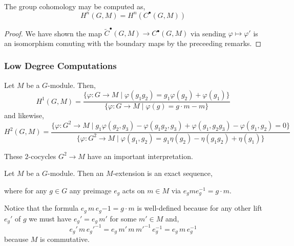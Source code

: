 \documentclass[12pt]{article}
\begin{document}
\begin{prop}
The group cohomology may be computed as,
\[ H^n(G, M) = H^n(C^\bullet(G, M)) \]
\end{prop}

\begin{proof}
We have shown the map $\tilde{C}^\bullet(G, M) \to C^\bullet(G, M)$ via sending $\varphi \mapsto \varphi'$ is an isomorphism comuting with the boundary maps by the preceeding remarks.
\end{proof}

\subsubsection{Low Degree Computations}

\begin{prop}
Let $M$ be a $G$-module. Then,
\[ H^1(G, M) = \frac{ \{ \varphi : G \to M \mid \varphi(g_1 g_2) = g_1 \varphi(g_2) + \varphi(g_1) \} }{\{ \varphi : G \to M \mid  \varphi(g) = g \cdot m - m \}} \]
and likewise,
\[ H^2(G, M) = \frac{\{ \varphi : G^2 \to M \mid g_1 \varphi(g_2, g_3) - \varphi(g_1 g_2, g_3) + \varphi(g_1, g_2 g_3) - \varphi(g_1, g_2) = 0 \}}{\{ \varphi : G^2 \to M \mid \varphi(g_1, g_2) = g_1 \eta(g_2) - \eta(g_1 g_2) + \eta(g_1) \}} \]
\end{prop}

\begin{rmk}
These $2$-cocycles $G^2 \to M$ have an important interpretation.
\end{rmk}

\begin{defn}
Let $M$ be a $G$-module. Then an $M$-extension is an exact sequence,
\begin{center}
\end{center}
where for any $g \in G$ any preimage $e_g$ acts on $m \in M$ via $e_g m e_g^{-1} = g \cdot m$.
\end{defn}

\begin{rmk}
Notice that the formula $e_g \, m  \, e_g{-1} = g \cdot m$ is well-defined because for any other lift $e_g'$ of $g$ we must have $e_g' = e_g \, m'$ for some $m' \in M$ and,
\[ e_g' \, m \, e_g'^{-1} = e_g \, m' \, m \, m'^{-1} \, e_g^{-1} = e_g \, m \, e_g^{-1} \]
because $M$ is commutative.
\end{rmk}
\end{document}
